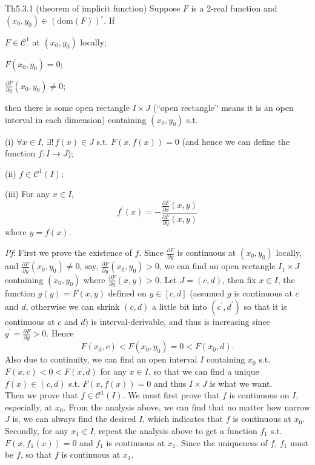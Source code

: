 \documentclass{article}
\newcommand{\parfrac}[2]{\frac{\partial #1}{\partial #2}}
\begin{document}
\begin{Th}{Th5.3.1 (theorem of implicit function)}
    Suppose $F$ is a 2-real function and $(x_0, y_0)\in (\text{dom}(F))^\circ$. If
    \begin{compactenum}
        \item $F\in\mathcal{C}^1$ at $(x_0, y_0)$ locally;
        \item $F(x_0, y_0) = 0$;
        \item $\parfrac{F}{y}(x_0, y_0)\neq 0$;
    \end{compactenum}
    then there is some open rectangle $I\times J$ (``open rectangle'' means it is an open interval in each dimension) containing $(x_0, y_0)$ s.t.
    \begin{compactenum}
        \item[(i)] $\forall x\in I$, $\exists!\, f(x)\in J$ s.t. $F(x, f(x)) = 0$ (and hence we can define the function $f: I\rightarrow J$);
        \item[(ii)] $f\in\mathcal{C}^1(I)$;
        \item[(iii)] For any $x\in I$,
        \begin{equation}
            f^\prime (x) = -\frac{\parfrac{F}{x}(x, y)}{\parfrac{F}{y}(x, y)}
            \tag{1}
        \end{equation}
        where $y=f(x)$.
    \end{compactenum}
    \tcblower
    \textit{Pf}: First we prove the existence of $f$. Since $\parfrac{F}{y}$ is continuous at $(x_0, y_0)$ locally, and $\parfrac{F}{y}(x_0, y_0)\neq 0$, say, $\parfrac{F}{y}(x_0, y_0) > 0$, we can find an open rectangle $I_1\times J$ containing $(x_0, y_0)$ where $\parfrac{F}{y}(x, y) > 0$. 
    Let $J = (c, d)$, then fix $x\in I$, the function $g(y) = F(x, y)$ defined on $y\in [c,d]$ (assumed $g$ is continuous at $c$ and $d$, otherwise we can shrink $(c,d)$ a little bit into $(c^\prime, d^\prime)$ so that it is continuous at $c$ and $d$) is interval-derivable, and thus is increasing since $g^\prime = \parfrac{F}{y} > 0$. Hence
    $$ F(x_0,c) < F(x_0, y_0) = 0 < F(x_0,d). $$
    Also due to continuity, we can find an open interval $I$ containing $x_0$ s.t. $ F(x,c) < 0 < F(x,d) $ for any $x\in I$, so that we can find a unique $f(x)\in (c,d)$ s.t. $F(x, f(x))=0$ and thus $I\times J$ is what we want.\\
    Then we prove that $f\in\mathcal{C}^1 (I)$. We must first prove that $f$ is continuous on $I$, especially, at $x_0$. From the analysis above, we can find that no matter how narrow $J$ is, we can always find the desired $I$, which indicates that $f$ is continuous at $x_0$. Secondly, for any $x_1\in I$, repeat the analysis above to get a function $f_1$ s.t. $F(x, f_1(x)) = 0$ and $f_1$ is continuous at $x_1$. Since the uniqueness of $f$, $f_1$ must be $f$, so that $f$ is continuous at $x_1$.\\

\end{Th}
\end{document}

